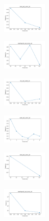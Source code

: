 \begin{figure}[H]
\begin{subfigure}
        \centering
        \includegraphics[width=0.234\textwidth]{img/copkm2/rand_set_const_10_277451237_time.png}
    \end{subfigure}
    \hfill
    \begin{subfigure}
        \centering
        \includegraphics[width=0.234\textwidth]{img/copkm2/newthyroid_set_const_10_277451237_time.png}
    \end{subfigure}
    \hfill
    \begin{subfigure}
        \centering
        \includegraphics[width=0.234\textwidth]{img/copkm2/iris_set_const_10_49258669_time.png}
    \end{subfigure}
    \hfill
    \begin{subfigure}
        \centering
        \includegraphics[width=0.234\textwidth]{img/copkm2/ecoli_set_const_10_49258669_time.png}
    \end{subfigure}
    \hfill
    \begin{subfigure}
        \centering
        \includegraphics[width=0.234\textwidth]{img/copkm2/rand_set_const_10_49258669_time.png}
    \end{subfigure}
    \hfill
    \begin{subfigure}
        \centering
        \includegraphics[width=0.234\textwidth]{img/copkm2/newthyroid_set_const_10_49258669_time.png}

\end{subfigure}
\end{figure}
